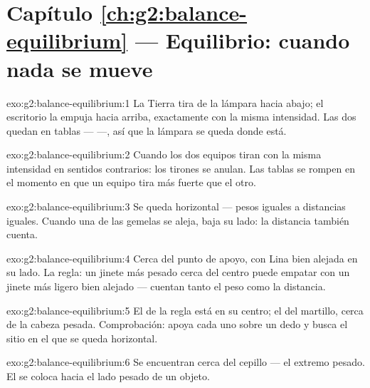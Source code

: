 \section*{Capítulo \ref{ch:g2:balance-equilibrium} --- Equilibrio: cuando nada se mueve}

\begin{solution}{exo:g2:balance-equilibrium:1}
La Tierra tira de la lámpara hacia abajo; el escritorio la empuja
hacia arriba, exactamente con la misma intensidad. Las dos 
quedan en tablas ---  ---, así que la lámpara se queda
donde está.
\end{solution}

\begin{solution}{exo:g2:balance-equilibrium:2}
Cuando los dos equipos tiran con la misma intensidad en sentidos
contrarios: los tirones se anulan. Las tablas se rompen en el momento
en que un equipo tira más fuerte que el otro.
\end{solution}

\begin{solution}{exo:g2:balance-equilibrium:3}
Se queda horizontal --- pesos iguales a distancias iguales. Cuando una
de las gemelas se aleja, baja su lado: la distancia también cuenta.
\end{solution}

\begin{solution}{exo:g2:balance-equilibrium:4}
Cerca del punto de apoyo, con Lina bien alejada en su lado. La regla:
un jinete más pesado cerca del centro puede empatar con un jinete más
ligero bien alejado --- cuentan tanto el peso como la distancia.
\end{solution}

\begin{solution}{exo:g2:balance-equilibrium:5}
El  de la regla está en su centro; el del martillo,
cerca de la cabeza pesada. Comprobación: apoya cada uno sobre un dedo
y busca el sitio en el que se queda horizontal.
\end{solution}

\begin{solution}{exo:g2:balance-equilibrium:6}
Se encuentran cerca del cepillo --- el extremo pesado. El
 se coloca hacia el lado pesado de un objeto.
\end{solution}

